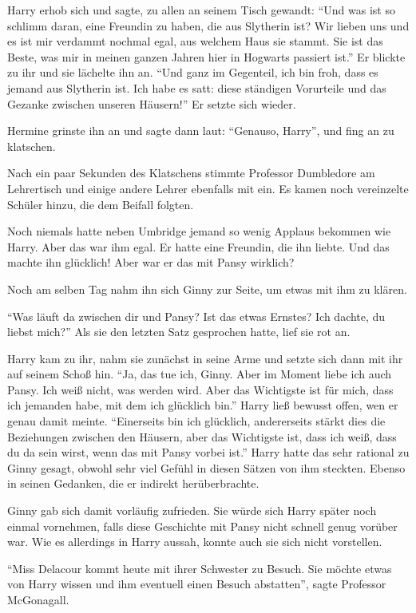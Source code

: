 Harry erhob sich und sagte, zu allen an seinem Tisch gewandt: \enquote{Und was ist so schlimm daran, eine Freundin zu haben, die aus Slytherin ist? Wir lieben uns und es ist mir verdammt nochmal egal, aus welchem Haus sie stammt. Sie ist das Beste, was mir in meinen ganzen Jahren hier in Hogwarts passiert ist.} Er blickte zu ihr und sie lächelte ihn an. \enquote{Und ganz im Gegenteil, ich bin froh, dass es jemand aus Slytherin ist. Ich habe es satt: diese ständigen Vorurteile und das Gezanke zwischen unseren Häusern!} Er setzte sich wieder.

Hermine grinste ihn an und sagte dann laut: \enquote{Genauso, Harry}, und fing an zu klatschen.

Nach ein paar Sekunden des Klatschens stimmte Professor Dumbledore am Lehrertisch und einige andere Lehrer ebenfalls mit ein. Es kamen noch vereinzelte Schüler hinzu, die dem Beifall folgten.

Noch niemals hatte neben Umbridge jemand so wenig Applaus bekommen wie Harry. Aber das war ihm egal. Er hatte eine Freundin, die ihn liebte. Und das machte ihn glücklich! Aber war er das mit Pansy wirklich?

Noch am selben Tag nahm ihn sich Ginny zur Seite, um etwas mit ihm zu klären.

\enquote{Was läuft da zwischen dir und Pansy? Ist das etwas Ernstes? Ich dachte, du liebst mich?} Als sie den letzten Satz gesprochen hatte, lief sie rot an.

Harry kam zu ihr, nahm sie zunächst in seine Arme und setzte sich dann mit ihr auf seinem Schoß hin. \enquote{Ja, das tue ich, Ginny. Aber im Moment liebe ich auch Pansy. Ich weiß nicht, was werden wird. Aber das Wichtigste ist für mich, dass ich jemanden habe, mit dem ich glücklich bin.} Harry ließ bewusst offen, wen er genau damit meinte. \enquote{Einerseits bin ich glücklich, andererseits stärkt dies die Beziehungen zwischen den Häusern, aber das Wichtigste ist, dass ich weiß, dass du da sein wirst, wenn das mit Pansy vorbei ist.} Harry hatte das sehr rational zu Ginny gesagt, obwohl sehr viel Gefühl in diesen Sätzen von ihm steckten. Ebenso in seinen Gedanken, die er indirekt herüberbrachte.

Ginny gab sich damit vorläufig zufrieden. Sie würde sich Harry später noch einmal vornehmen, falls diese Geschichte mit Pansy nicht schnell genug vorüber war. Wie es allerdings in Harry aussah, konnte auch sie sich nicht vorstellen.

\trenn

\enquote{Miss Delacour kommt heute mit ihrer Schwester zu Besuch. Sie möchte etwas von Harry wissen und ihm eventuell einen Besuch abstatten}, sagte Professor McGonagall.

